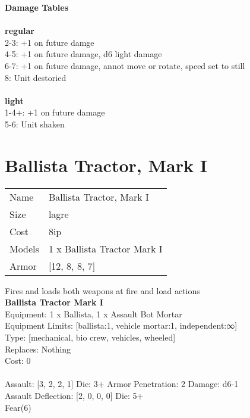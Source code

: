 {\bf Damage Tables} \\
\ \\ {\bf regular } \\
2-3: +1 on future damge \\
4-5: +1 on future damage, d6 light damage \\
6-7: +1 on future damage, annot move or rotate, speed set to still \\
8: Unit destoried \\
\ \\ {\bf light } \\
1-4+: +1 on future damage \\
5-6: Unit shaken \\










\pagebreak\pagebreak

\section{ Ballista Tractor, Mark I }

\begin{tabular}{ll}
  Name & Ballista Tractor, Mark I \\
  Size & lagre\\
  Cost & 8ip\\
  Models & 1 x Ballista Tractor Mark I\\
  Armor & [12, 8, 8, 7]\\
\end{tabular}

\noindent Fires and loads both weapons at fire and load actions\\ 


{\bf Ballista Tractor Mark I } \\
Equipment: 1 x Ballista, 1 x Assault Bot Mortar \\
Equipment Limits: [ballista:1, vehicle mortar:1, independent:∞] \\
Type: [mechanical, bio crew, vehicles, wheeled] \\
Replaces: Nothing \\
Cost: 0\\
\ \\
Assault: [3, 2, 2, 1] Die: 3+ Armor Penetration: 2 Damage: d6-1 \\
Assault Deflection: [2, 0, 0, 0] Die: 5+\\
\indent Fear(6)\\ 
 
